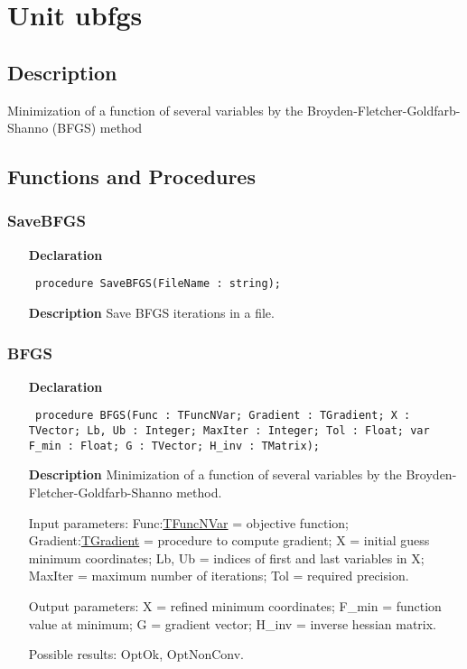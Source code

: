 \documentclass[12pt,a4paper,oneside]{report}
\newcommand{\declarationitem}[1]{\textbf{#1}}
\newcommand{\descriptiontitle}[1]{\textbf{#1}}
\newcommand{\code}[1]{\texttt{#1}}
\begin{document}
\section{Unit ubfgs}
\label{ubfgs}
\subsection{Description}
Minimization of a function of several variables by the Broyden{-}Fletcher{-}Goldfarb{-}Shanno (BFGS) method 
\subsection{Functions and Procedures}
\subsubsection{SaveBFGS}
\label{ubfgs-SaveBFGS}
\begin{itemize}\item[\declarationitem{Declaration}\hfill]
	\begin{flushleft}
		\code{
			procedure SaveBFGS(FileName : string);}
		
	\end{flushleft}
	
	\par
	\item[\descriptiontitle{Description}]
	Save BFGS iterations in a file.
\end{itemize}
\subsubsection{BFGS}
\label{ubfgs-BFGS}
\begin{itemize}\item[\declarationitem{Declaration}\hfill]
	\begin{flushleft}
		\code{
			procedure BFGS(Func : TFuncNVar; Gradient : TGradient; X : TVector; Lb, Ub : Integer; MaxIter : Integer; Tol : Float; var F{\_}min : Float; G : TVector; H{\_}inv : TMatrix);}
		
	\end{flushleft}
	
	\par
	\item[\descriptiontitle{Description}]
	Minimization of a function of several variables by the Broyden{-}Fletcher{-}Goldfarb{-}Shanno method.
	
	Input parameters: Func:\hyperref[utypes-TFuncNVar]{TFuncNVar} = objective function; Gradient:\hyperref[utypes-TGradient]{TGradient} = procedure to compute gradient; X = initial guess minimum coordinates; Lb, Ub = indices of first and last variables in X; MaxIter = maximum number of iterations; Tol = required precision.
	
	Output parameters: X = refined minimum coordinates; F{\_}min = function value at minimum; G = gradient vector; H{\_}inv = inverse hessian matrix.
	
	Possible results: OptOk, OptNonConv.
	
\end{itemize}
\end{document}
